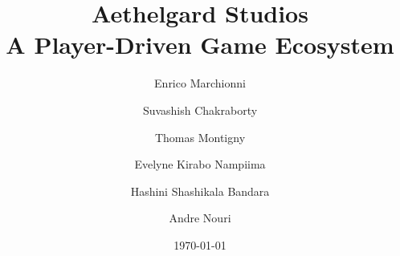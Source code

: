 \documentclass[12pt,a4paper]{article}
\title{Aethelgard Studios \\[0.4em] \large A Player-Driven Game Ecosystem}
\author{Enrico Marchionni} %
\author{Suvashish Chakraborty}
\author{Thomas Montigny}
\author{Evelyne Kirabo Nampiima}
\author{Hashini Shashikala Bandara}
\author{Andre Nouri}
\affil{} %
\date{\today}
\begin{document}
\maketitle
\tableofcontents

\newpage

\newpage

\newpage

\newpage

\newpage

\newpage

\newpage


\conclusion
\end{document}
